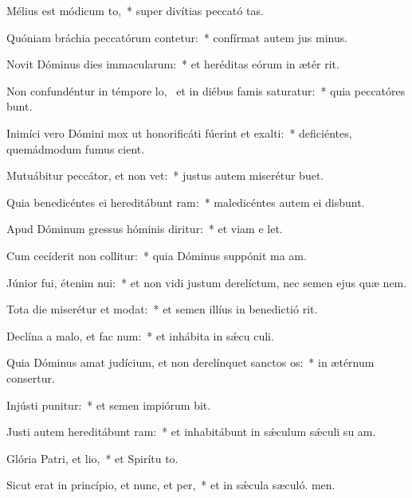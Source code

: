 \item Mélius est módicum to,~* super divítias peccató tas.
\item Quóniam bráchia peccatórum contetur:~* confírmat autem jus minus.
\item Novit Dóminus dies immacularum:~* et heréditas eórum in ætér rit.
\item Non confundéntur in témpore lo,~\pscross{} et in diébus famis saturatur:~* quia peccatóres bunt.
\item Inimíci vero Dómini mox ut honorificáti fúerint et exalti:~* deficiéntes, quemádmodum fumus cient.
\item Mutuábitur peccátor, et non vet:~* justus autem miserétur  buet.
\item Quia benedicéntes ei hereditábunt ram:~* maledicéntes autem ei disbunt.
\item Apud Dóminum gressus hóminis diritur:~* et viam e let.
\item Cum cecíderit non collitur:~* quia Dóminus suppónit ma am.
\item Júnior fui, étenim nui:~* et non vidi justum derelíctum, nec semen ejus quæ nem.
\item Tota die miserétur et modat:~* et semen illíus in benedictió rit.
\item Declína a malo, et fac num:~* et inhábita in sǽcu culi.
\item Quia Dóminus amat judícium, et non derelínquet sanctos os:~* in ætérnum consertur.
\item Injústi punitur:~* et semen impiórum bit.
\item Justi autem hereditábunt ram:~* et inhabitábunt in sǽculum sǽculi su am.
\item Glória Patri, et lio,~* et Spirítu to.
\item Sicut erat in princípio, et nunc, et per,~* et in sǽcula sæculó. men.

